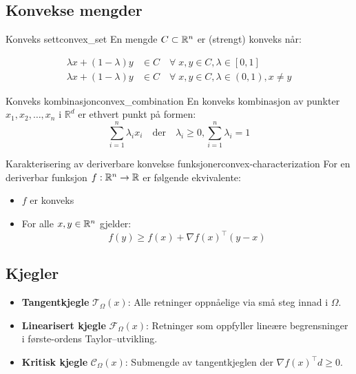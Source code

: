 \subsection{Konvekse mengder}
\begin{definition}{Konveks sett}{convex_set}
	En mengde \(C \subset \mathbb{R}^n\) er (strengt) konveks når:

	\begin{align*}
		\lambda x + (1 - \lambda)y & \in C \quad \forall \; x, y \in C, \lambda \in [0, 1] \tag{Konveks}                   \\
		\lambda x + (1 - \lambda)y & \in C \quad \forall \; x, y \in C, \lambda \in (0, 1), x \neq y \tag{Strengt konveks}
	\end{align*}

\end{definition}

\begin{definition}{Konveks kombinasjon}{convex_combination}
	En konveks kombinasjon av punkter \( x_1, x_2, \ldots, x_n \) i \( \mathbb{R}^d \) er ethvert punkt på formen:
	\[
		\sum_{i=1}^n \lambda_i x_i \quad \text{der} \quad \lambda_i \geq 0, \sum_{i=1}^n \lambda_i = 1
	\]
\end{definition}

\begin{remark}{Karakterisering av deriverbare konvekse funksjoner}{convex-characterization}
	For en deriverbar funksjon  \(f: \mathbb{R}^n \to \mathbb{R}\) er følgende ekvivalente:
	\begin{itemize}
		\item  \(f\) er konveks
		\item For alle  \(x, y \in \mathbb{R}^n\) gjelder:
		      \[
			      f(y) \geq f(x) + \nabla f(x)^\top (y - x)
		      \]
	\end{itemize}
\end{remark}

\subsection{Kjegler}
\begin{itemize}
	\item \textbf{Tangentkjegle} $\mathcal T_{\Omega}(x)$: Alle retninger oppnåelige via små steg innad i $\Omega$.
	\item \textbf{Linearisert kjegle} $\mathcal F_{\Omega}(x)$: Retninger som oppfyller lineære begrensninger i første-ordens Taylor--utvikling.
	\item \textbf{Kritisk kjegle} $\mathcal C_{\Omega}(x)$: Submengde av tangentkjeglen der $\nabla f(x)^\top d \ge 0$.
\end{itemize}

